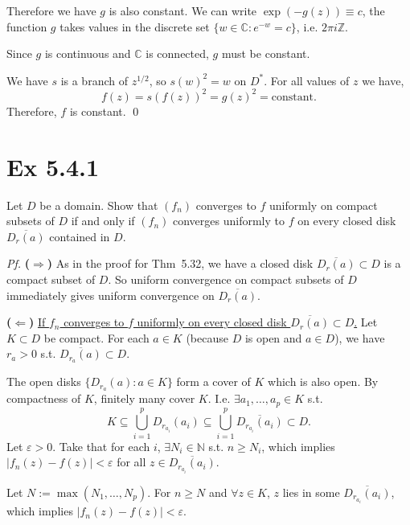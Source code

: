 \documentclass[a4paper]{article}
\newcommand{\C}{\mathbb{C}}
\newcommand{\N}{\mathbb{N}}
\newcommand{\Z}{\mathbb{Z}}
\begin{document}
\medskip
Therefore we have $g$ is also constant. We can write $\exp(-g(z)) \equiv c$, the function $g$ takes values
in the discrete set $\{w \in \C : e^{-w} = c\}$, i.e. $2\pi i \Z$.

Since $g$ is continuous and $\C$ is connected, $g$ must be constant.

\medskip
We have $s$ is a branch of $z^{1/2}$, so $s(w)^2 = w$ on $D^*$. For all values of $z$ we have,
\[
f(z) = s(f(z))^2 = g(z)^2 = \text{constant}.
\]
Therefore, $f$ is constant. \qed

\newpage
\section*{Ex 5.4.1}

\begin{tcolorbox}[colback=gray!10, colframe=black, boxrule=0.5pt, arc=2mm]
Let $D$ be a domain. Show that $(f_n)$ converges to $f$ uniformly on compact subsets
of $D$ if and only if $(f_n)$ converges uniformly to $f$ on every closed disk
$\overline{D_r(a)}$ contained in $D$.
\end{tcolorbox}

\textit{Pf.} \textbf{($\Rightarrow$)} As in the proof for Thm~5.32, we have a closed disk $\overline{D_r(a)} \subset D$ is a compact subset of $D$. So uniform convergence on compact subsets of $D$
immediately gives uniform convergence on $\overline{D_r(a)}$.

\medskip
\textbf{($\Leftarrow$)} \underline{If $f_n$ converges to $f$ uniformly on every closed disk
$\overline{D_r(a)} \subset D$.} Let $K \subset D$ be compact. For each $a \in K$ (because $D$ is open and $a \in D$), we have $r_a > 0$ s.t.
$\overline{D_{r_a}(a)} \subset D$. 

\medskip
The open disks $\{D_{r_a}(a) : a \in K\}$ form a cover of $K$ which is also open. By compactness of $K$, finitely many cover $K$. I.e.
$\exists a_1, \dots, a_p \in K$ s.t.
\[
K \subseteq \bigcup_{i=1}^p D_{r_{a_i}}(a_i) \subseteq \bigcup_{i=1}^p \overline{D_{r_{a_i}}(a_i)} \subset D.
\]
Let $\varepsilon > 0$. Take that for each $i$, $\exists N_i \in \N$ s.t. $n \geq N_i$, which implies $|f_n(z) - f(z)| < \varepsilon$ for all $z \in \overline{D_{r_{a_i}}(a_i)}$.

Let $N := \max(N_1, \dots, N_p)$. For $n \geq N$ and $\forall z \in K$, $z$ lies in some
$\overline{D_{r_{a_i}}(a_i)}$, which implies $|f_n(z) - f(z)| < \varepsilon$.
\end{document}
